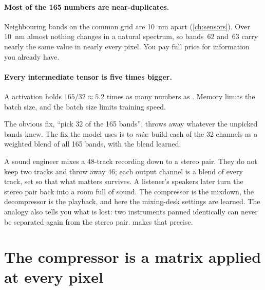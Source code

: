 \paragraph{Most of the 165 numbers are near-duplicates.} Neighbouring bands on the common grid are
10~nm apart (\cref{ch:sensors}). Over 10~nm almost nothing changes in a natural spectrum, so bands~62
and~63 carry nearly the same value in nearly every pixel. You pay full price for information you
already have.

\paragraph{Every intermediate tensor is five times bigger.} A  activation holds
$165/32\approx5.2$ times as many numbers as . Memory limits the batch size, and
the batch size limits training speed.

The obvious fix, ``pick 32 of the 165 bands'', throws away whatever the unpicked bands knew. The fix
the model uses is to \emph{mix}: build each of the 32 channels as a weighted blend of all 165 bands, with
the blend learned.

\begin{analogy}
A sound engineer mixes a 48-track recording down to a stereo pair. They do not keep two tracks and
throw away 46; each output channel is a blend of every track, set so that what matters survives. A
listener's speakers later turn the stereo pair back into a room full of sound. The compressor is the
mixdown, the decompressor is the playback, and here the mixing-desk settings are learned. The analogy
also tells you what is lost: two instruments panned identically can never be separated again from the
stereo pair.  makes that precise.
\end{analogy}


\section{The compressor is a matrix applied at every pixel}\label{sec:compressor:matrix}

